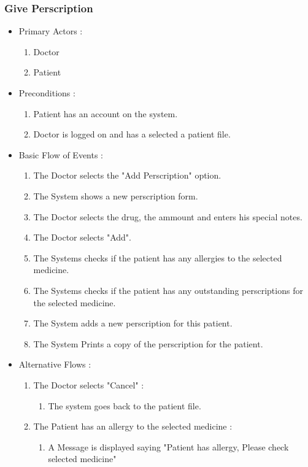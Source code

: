 \documentclass[14pt]{article}
\begin{document}
\subsubsection{Give Perscription}
\begin{itemize}
		\item Primary Actors : 
			\begin{enumerate}
				\item Doctor
				\item Patient
			\end{enumerate}
		\item Preconditions :
			\begin{enumerate}
				\item Patient has an account on the system.
				\item Doctor is logged on and has a selected a patient file.
			\end{enumerate}
		\item Basic Flow of Events :
			\begin{enumerate}
				\item The Doctor selects the "Add Perscription" option.
				\item The System shows a new perscription form.
				\item The Doctor selects the drug, the ammount and enters his special notes.
				\item The Doctor selects "Add".
				\item The Systems checks if the patient has any allergies to the selected medicine.
				\item The Systems checks if the patient has any outstanding perscriptions for the selected medicine.
				\item The System adds a new perscription for this patient.
				\item The System Prints a copy of the perscription for the patient. 
			\end{enumerate}
		\item Alternative Flows :
			\begin{enumerate}
				\item The Doctor selects "Cancel" : 
					\begin{enumerate}
						\item The system goes back to the patient file.
					\end{enumerate}
				\item The Patient has an allergy to the selected medicine :
					\begin{enumerate}
						\item A Message is displayed saying "Patient has allergy, Please check selected medicine"

\end{enumerate}
\end{enumerate}
\end{itemize}
\end{document}
